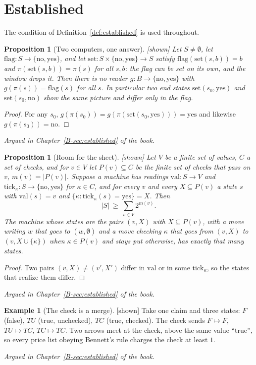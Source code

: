 \documentclass[11pt, a4paper]{article}
\theoremstyle{plain}
\newtheorem{proposition}[theorem]{Proposition}
\theoremstyle{definition}
\newtheorem{example}[theorem]{Example}
\theoremstyle{remark}
\newcommand{\Bool}{\{\mathrm{no},\mathrm{yes}\}}
\newcommand{\argued}[1]{\par\noindent\textit{Argued in Chapter~\ref{B-#1} of the book.}\par}
\newcommand{\kind}[1]{\textup{[#1]}}
\begin{document}
\section{Established}\label{spec:ch08}

The condition of Definition~\ref{def:established} is used throughout.

\begin{proposition}[Two computers, one answer]\label{spec:two-computers} \kind{shown}
Let $S\ne\emptyset$, let $\mathrm{flag}:S\to\Bool$, and let $\mathrm{set}:S\times\Bool\to S$ satisfy
$\mathrm{flag}(\mathrm{set}(s,b))=b$ and $\pi(\mathrm{set}(s,b))=\pi(s)$ for all $s,b$: the flag can be set on
its own, and the window drops it. Then there is no reader $g:B\to\Bool$ with $g(\pi(s))=\mathrm{flag}(s)$ for
all $s$. In particular two end states $\mathrm{set}(s_0,\mathrm{yes})$ and $\mathrm{set}(s_0,\mathrm{no})$
show the same picture and differ only in the flag.
\end{proposition}
\begin{proof}
For any $s_0$, $g(\pi(s_0))=g(\pi(\mathrm{set}(s_0,\mathrm{yes})))=\mathrm{yes}$ and likewise
$g(\pi(s_0))=\mathrm{no}$.
\end{proof}
\argued{sec:established}

\begin{proposition}[Room for the sheet]\label{spec:sheets} \kind{shown}
Let $V$ be a finite set of values, $C$ a set of checks, and for $v\in V$ let $P(v)\subseteq C$ be the finite
set of checks that pass on $v$, $m(v)=|P(v)|$. Suppose a machine has readings $\mathrm{val}:S\to V$ and
$\mathrm{tick}_\kappa:S\to\Bool$ for $\kappa\in C$, and for every $v$ and every $X\subseteq P(v)$ a state $s$
with $\mathrm{val}(s)=v$ and $\{\kappa:\mathrm{tick}_\kappa(s)=\mathrm{yes}\}=X$. Then
\[
|S|\ \ge\ \sum_{v\in V}2^{m(v)}.
\]
The machine whose states are the pairs $(v,X)$ with $X\subseteq P(v)$, with a move writing $w$ that goes to
$(w,\emptyset)$ and a move checking $\kappa$ that goes from $(v,X)$ to $(v,X\cup\{\kappa\})$ when
$\kappa\in P(v)$ and stays put otherwise, has exactly that many states.
\end{proposition}
\begin{proof}
Two pairs $(v,X)\ne(v',X')$ differ in $\mathrm{val}$ or in some $\mathrm{tick}_\kappa$, so the states that
realize them differ.
\end{proof}
\argued{sec:established}

\begin{example}[The check is a merge]\label{spec:check-merge} \kind{shown}
Take one claim and three states: $F$ (false), $TU$ (true, unchecked), $TC$ (true, checked). The check
sends $F\mapsto F$, $TU\mapsto TC$, $TC\mapsto TC$. Two arrows meet at the check, above the same value
``true'', so every price list obeying Bennett's rule charges the check at least $1$.
\end{example}
\argued{sec:established}
\end{document}
